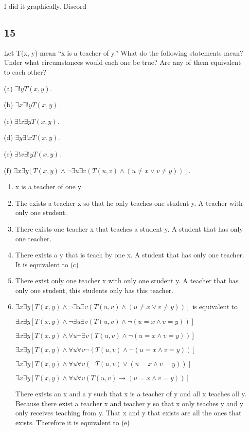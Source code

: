 \documentclass{article}
\begin{document}
I did it graphically. Discord
\subsection{15}
Let T(x, y) mean “x is a teacher of y.” What do the following
statements mean? Under what circumstances would each one be true?
Are any of them equivalent to each other?

(a) $\exists ! yT(x, y)$.

(b) $\exists x \exists ! yT(x, y)$.

(c) $\exists ! x\exists yT(x, y)$.

(d) $\exists y \exists ! xT(x, y)$.

(e) $\exists ! x \exists ! yT(x, y)$.

(f) $\exists x \exists y[T(x, y) \land  \neg \exists u \exists v(T (u, v) \land (u \neq x \lor v \neq y))]$.

\begin{enumerate}[label=(\alph*)]
    \item 
    x is a teacher of one y
    \item
    The exists a teacher x so that he only teaches one student y. A teacher with only one student.
    \item
    There exists one teacher x that teaches a student y. A student that has only one teacher.
    \item
    There exists a y that is teach by one x. A student that has only one teacher. It is equivalent to (c)
    \item
    There exist only one teacher x with only one student y. A teacher that has only one student, this students only has this teacher.
    \item
    $\exists x \exists y[T(x, y) \land  \neg \exists u \exists v(T (u, v) \land (u \neq x \lor v \neq y))]$
    is equivalent to 
    
    $\exists x \exists y[T(x, y) \land  \neg \exists u \exists v(T (u, v) \land \neg (u = x \land v = y))]$
    
    $\exists x \exists y[T(x, y) \land  \forall u \neg \exists v(T (u, v) \land \neg (u = x \land v = y))]$
    
    $\exists x \exists y[T(x, y) \land  \forall u \forall v \neg (T (u, v) \land \neg (u = x \land v = y))]$
    
    $\exists x \exists y[T(x, y) \land  \forall u \forall v (\neg T (u, v) \lor  (u = x \land v = y))]$
    
    $\exists x \exists y[T(x, y) \land  \forall u \forall v ( T (u, v) \rightarrow  (u = x \land v = y))]$
    
    There exists an x and a y such that x is a teacher of y and all x teaches all y. Because there exist a teacher x and teacher y so that x only teaches y and y only receives teaching from y. That x and y that exists are all the ones that exists.
    Therefore it is equivalent to (e)
\end{enumerate}
\end{document}
